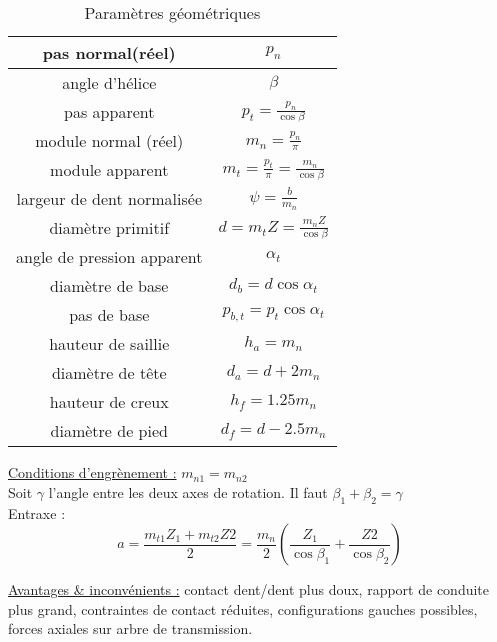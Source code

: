 \documentclass[../main.tex]{subfiles}
\begin{document}
\begin{table}[hbt!]
    \centering
    \begin{tabular}{c|c}
    \hline\hline
    
        pas normal(réel) & $p_n$ \\
        \hline
        angle d'hélice & $\beta$\\
        \hline
        pas apparent & $p_t = \frac{p_n}{\cos{\beta}}$\\
        \hline
        module normal (réel) & $m_n = \frac{p_n}{\pi}$\\
        \hline
        module apparent & $m_t = \frac{p_t}{\pi} = \frac{m_n}{\cos{\beta}}$\\
        \hline
        largeur de dent normalisée & $\psi = \frac{b}{m_n}$\\
        \hline
        diamètre primitif & $d = m_t Z = \frac{m_n Z}{\cos{\beta}}$\\
        \hline
        angle de pression apparent & $\alpha_t$\\
        \hline
        diamètre de base & $d_b = d \cos{\alpha_t}$\\
        \hline
        pas de base & $p_{b,t} = p_t \cos{\alpha_t}$\\
        \hline
        hauteur de saillie & $h_a = m_n$\\
        \hline
        diamètre de tête & $d_a = d+2m_n$\\
        \hline
        hauteur de creux & $h_f = 1.25 m_n$\\
        \hline
        diamètre de pied & $d_f = d-2.5m_n$\\
        \hline\hline
    \end{tabular}
    \caption{Paramètres géométriques}
    \label{tab:my_label}
\end{table}

\quad \underline{Conditions d'engrènement :} $m_{n1} = m_{n2}$\\
Soit $\gamma$ l'angle entre les deux axes de rotation. Il faut $\beta_1+\beta_2 = \gamma$\\

Entraxe : \begin{equation}
    a = \frac{m_{t1}Z_1+m_{t2}Z2}{2} = \frac{m_n}{2}(\frac{Z_1}{\cos{\beta_1}}+\frac{Z2}{\cos{\beta_2}})
\end{equation}

\underline{Avantages \& inconvénients :} contact dent/dent plus doux, rapport de conduite plus grand, contraintes de contact réduites, configurations gauches possibles, forces axiales sur arbre de transmission.\\
\end{document}
